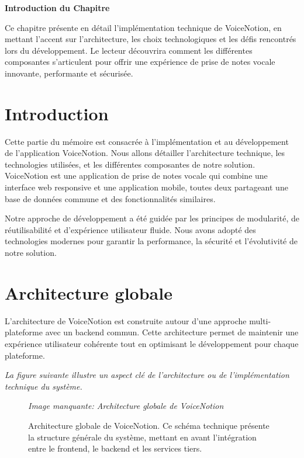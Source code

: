 
\begin{center}
\textbf{\large Introduction du Chapitre}
\end{center}

\noindent
Ce chapitre présente en détail l'implémentation technique de VoiceNotion, en mettant l'accent sur l'architecture, les choix technologiques et les défis rencontrés lors du développement. Le lecteur découvrira comment les différentes composantes s'articulent pour offrir une expérience de prise de notes vocale innovante, performante et sécurisée.

\section{Introduction}
Cette partie du mémoire est consacrée à l'implémentation et au développement de l'application VoiceNotion. Nous allons détailler l'architecture technique, les technologies utilisées, et les différentes composantes de notre solution. VoiceNotion est une application de prise de notes vocale qui combine une interface web responsive et une application mobile, toutes deux partageant une base de données commune et des fonctionnalités similaires.

Notre approche de développement a été guidée par les principes de modularité, de réutilisabilité et d'expérience utilisateur fluide. Nous avons adopté des technologies modernes pour garantir la performance, la sécurité et l'évolutivité de notre solution.

\section{Architecture globale}
L'architecture de VoiceNotion est construite autour d'une approche multi-plateforme avec un backend commun. Cette architecture permet de maintenir une expérience utilisateur cohérente tout en optimisant le développement pour chaque plateforme.

\noindent
\textit{La figure suivante illustre un aspect clé de l'architecture ou de l'implémentation technique du système.}
\begin{figure}[H]
\centering
\textit{Image manquante: Architecture globale de VoiceNotion}
\caption{Architecture globale de VoiceNotion. Ce schéma technique présente la structure générale du système, mettant en avant l'intégration entre le frontend, le backend et les services tiers.}
\label{fig:global-architecture}
\end{figure}


